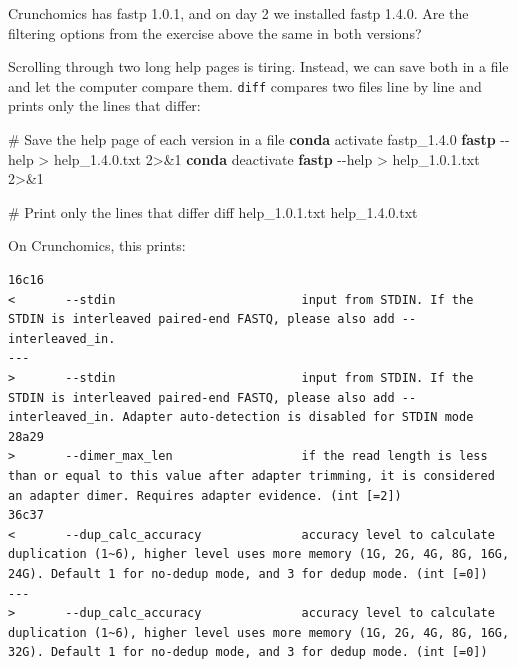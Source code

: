 \documentclass[
  letterpaper,
  DIV=11,
  numbers=noendperiod]{scrreprt}
\newenvironment{Shaded}{}{}
\newcommand{\AttributeTok}[1]{\textcolor[rgb]{0.84,0.23,0.29}{#1}}
\newcommand{\CommentTok}[1]{\textcolor[rgb]{0.42,0.45,0.49}{#1}}
\newcommand{\DecValTok}[1]{\textcolor[rgb]{0.00,0.36,0.77}{#1}}
\newcommand{\ExtensionTok}[1]{\textcolor[rgb]{0.84,0.23,0.29}{\textbf{#1}}}
\newcommand{\FunctionTok}[1]{\textcolor[rgb]{0.44,0.26,0.76}{#1}}
\newcommand{\NormalTok}[1]{\textcolor[rgb]{0.14,0.16,0.18}{#1}}
\newcommand{\OperatorTok}[1]{\textcolor[rgb]{0.14,0.16,0.18}{#1}}
\begin{document}
\begin{tcolorbox}[enhanced jigsaw, title=\textcolor{quarto-callout-tip-color}{\faLightbulb}\hspace{0.5em}{Tip: Compare the help pages of two versions (optional)}, rightrule=.15mm, titlerule=0mm, colframe=quarto-callout-tip-color-frame, toprule=.15mm, leftrule=.75mm, colbacktitle=quarto-callout-tip-color!10!white, bottomtitle=1mm, toptitle=1mm, arc=.35mm, opacitybacktitle=0.6, left=2mm, bottomrule=.15mm, breakable, opacityback=0, colback=white, coltitle=black]

Crunchomics has fastp 1.0.1, and on day 2 we installed fastp 1.4.0. Are
the filtering options from the exercise above the same in both versions?

Scrolling through two long help pages is tiring. Instead, we can save
both in a file and let the computer compare them. \texttt{diff} compares
two files line by line and prints only the lines that differ:

\begin{Shaded}
\begin{Highlighting}[]
\CommentTok{\# Save the help page of each version in a file}
\ExtensionTok{conda}\NormalTok{ activate fastp\_1.4.0}
\ExtensionTok{fastp} \AttributeTok{{-}{-}help} \OperatorTok{\textgreater{}}\NormalTok{ help\_1.4.0.txt }\DecValTok{2}\OperatorTok{\textgreater{}\&}\DecValTok{1}
\ExtensionTok{conda}\NormalTok{ deactivate}
\ExtensionTok{fastp} \AttributeTok{{-}{-}help} \OperatorTok{\textgreater{}}\NormalTok{ help\_1.0.1.txt }\DecValTok{2}\OperatorTok{\textgreater{}\&}\DecValTok{1}

\CommentTok{\# Print only the lines that differ}
\FunctionTok{diff}\NormalTok{ help\_1.0.1.txt help\_1.4.0.txt}
\end{Highlighting}
\end{Shaded}

On Crunchomics, this prints:

\begin{verbatim}
16c16
<       --stdin                          input from STDIN. If the STDIN is interleaved paired-end FASTQ, please also add --interleaved_in.
---
>       --stdin                          input from STDIN. If the STDIN is interleaved paired-end FASTQ, please also add --interleaved_in. Adapter auto-detection is disabled for STDIN mode
28a29
>       --dimer_max_len                  if the read length is less than or equal to this value after adapter trimming, it is considered an adapter dimer. Requires adapter evidence. (int [=2])
36c37
<       --dup_calc_accuracy              accuracy level to calculate duplication (1~6), higher level uses more memory (1G, 2G, 4G, 8G, 16G, 24G). Default 1 for no-dedup mode, and 3 for dedup mode. (int [=0])
---
>       --dup_calc_accuracy              accuracy level to calculate duplication (1~6), higher level uses more memory (1G, 2G, 4G, 8G, 16G, 32G). Default 1 for no-dedup mode, and 3 for dedup mode. (int [=0])
\end{verbatim}


\end{tcolorbox}
\end{document}
